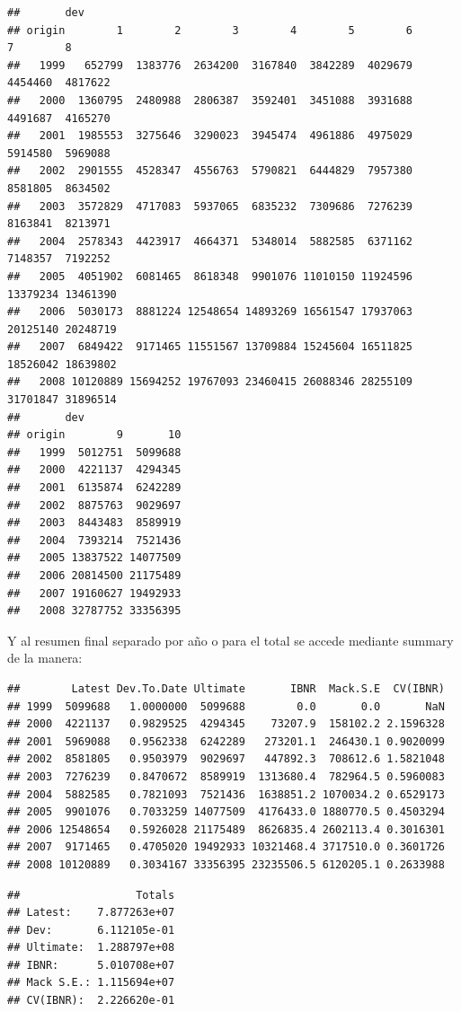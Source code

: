 \documentclass[
  12pt,
]{article}
\begin{document}
\begin{verbatim}
##       dev
## origin        1        2        3        4        5        6        7        8
##   1999   652799  1383776  2634200  3167840  3842289  4029679  4454460  4817622
##   2000  1360795  2480988  2806387  3592401  3451088  3931688  4491687  4165270
##   2001  1985553  3275646  3290023  3945474  4961886  4975029  5914580  5969088
##   2002  2901555  4528347  4556763  5790821  6444829  7957380  8581805  8634502
##   2003  3572829  4717083  5937065  6835232  7309686  7276239  8163841  8213971
##   2004  2578343  4423917  4664371  5348014  5882585  6371162  7148357  7192252
##   2005  4051902  6081465  8618348  9901076 11010150 11924596 13379234 13461390
##   2006  5030173  8881224 12548654 14893269 16561547 17937063 20125140 20248719
##   2007  6849422  9171465 11551567 13709884 15245604 16511825 18526042 18639802
##   2008 10120889 15694252 19767093 23460415 26088346 28255109 31701847 31896514
##       dev
## origin        9       10
##   1999  5012751  5099688
##   2000  4221137  4294345
##   2001  6135874  6242289
##   2002  8875763  9029697
##   2003  8443483  8589919
##   2004  7393214  7521436
##   2005 13837522 14077509
##   2006 20814500 21175489
##   2007 19160627 19492933
##   2008 32787752 33356395
\end{verbatim}

Y al resumen final separado por año o para el total se accede mediante
summary de la manera:

\begin{verbatim}
##        Latest Dev.To.Date Ultimate       IBNR  Mack.S.E  CV(IBNR)
## 1999  5099688   1.0000000  5099688        0.0       0.0       NaN
## 2000  4221137   0.9829525  4294345    73207.9  158102.2 2.1596328
## 2001  5969088   0.9562338  6242289   273201.1  246430.1 0.9020099
## 2002  8581805   0.9503979  9029697   447892.3  708612.6 1.5821048
## 2003  7276239   0.8470672  8589919  1313680.4  782964.5 0.5960083
## 2004  5882585   0.7821093  7521436  1638851.2 1070034.2 0.6529173
## 2005  9901076   0.7033259 14077509  4176433.0 1880770.5 0.4503294
## 2006 12548654   0.5926028 21175489  8626835.4 2602113.4 0.3016301
## 2007  9171465   0.4705020 19492933 10321468.4 3717510.0 0.3601726
## 2008 10120889   0.3034167 33356395 23235506.5 6120205.1 0.2633988
\end{verbatim}

\begin{verbatim}
##                  Totals
## Latest:    7.877263e+07
## Dev:       6.112105e-01
## Ultimate:  1.288797e+08
## IBNR:      5.010708e+07
## Mack S.E.: 1.115694e+07
## CV(IBNR):  2.226620e-01
\end{verbatim}
\end{document}

